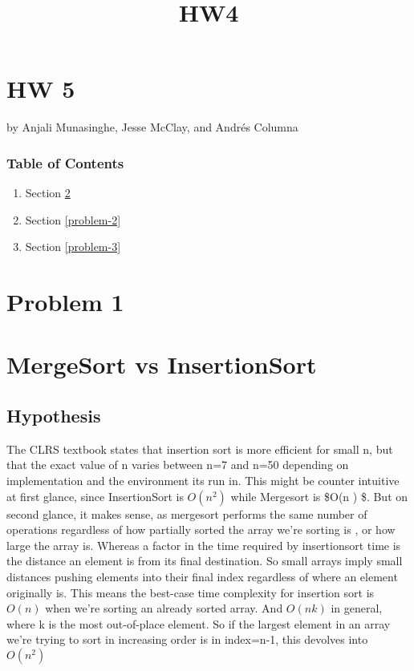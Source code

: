 \documentclass[11pt]{article}
\title{HW4}
\begin{document}
    
    
    \maketitle
    
    

    
    \section{HW 5}\label{hw-5}

by Anjali Munasinghe, Jesse McClay, and Andrés Columna

\subsubsection{Table of Contents}\label{table-of-contents}

\begin{enumerate}
\def\labelenumi{\arabic{enumi}.}
\item
  Section \ref{problem-1}
\item
  Section \ref{problem-2}
\item
  Section \ref{problem-3}
\end{enumerate}

    \section{Problem 1}\label{problem-1}

\section{MergeSort vs InsertionSort}\label{mergesort-vs-insertionsort}

    \subsection{Hypothesis}\label{hypothesis}

The CLRS textbook states that insertion sort is more efficient for small
n, but that the exact value of n varies between n=7 and n=50 depending
on implementation and the environment its run in. This might be counter
intuitive at first glance, since InsertionSort is \(O(n^2)\) while
Mergesort is \$O(n ) \$. But on second glance, it makes sense, as
mergesort performs the same number of operations regardless of how
partially sorted the array we're sorting is , or how large the array is.
Whereas a factor in the time required by insertionsort time is the
distance an element is from its final destination. So small arrays imply
small distances pushing elements into their final index regardless of
where an element originally is. This means the best-case time complexity
for insertion sort is \(O(n)\) when we're sorting an already sorted
array. And \(O(nk)\) in general, where k is the most out-of-place
element. So if the largest element in an array we're trying to sort in
increasing order is in index=n-1, this devolves into \(O(n^2)\)
\end{document}
